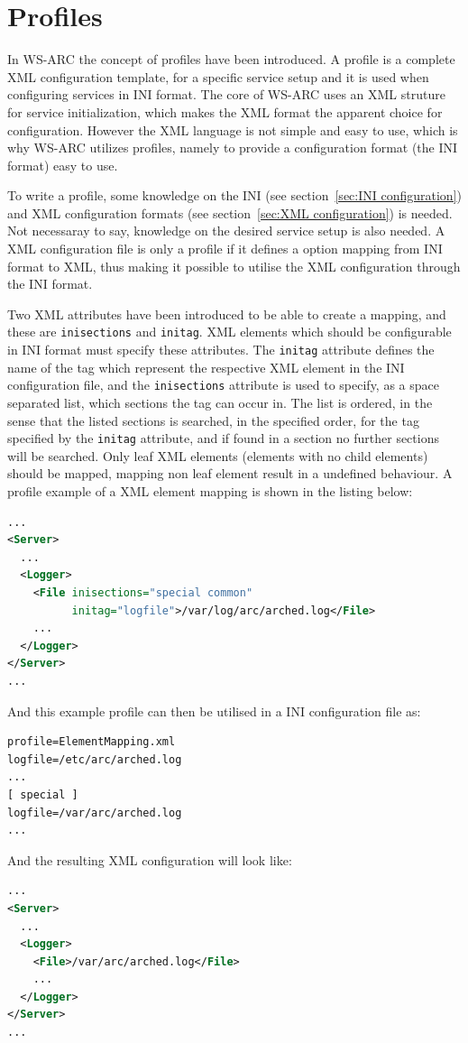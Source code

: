\documentclass{article}
\begin{document}
\section{Profiles}\label{sec:Profiles}
In WS-ARC the concept of profiles have been introduced. A profile is a complete
XML configuration template, for a specific service setup and it is used when
configuring services in INI format. The core of WS-ARC
uses an XML struture for service initialization, which makes the XML format
the apparent choice for configuration. However the XML language is not simple
and easy to use, which is why WS-ARC utilizes profiles, namely to provide a
configuration format (the INI format) easy to use.

To write a profile, some knowledge on the INI (see
section~\ref{sec:INI configuration}) and XML configuration formats (see
section~\ref{sec:XML configuration}) is needed. Not necessaray to say, knowledge
on the desired service setup is also needed. A XML configuration file is only a
profile if it defines a option mapping from INI format to XML, thus making it
possible to utilise the XML configuration through the INI format.

Two XML attributes have been introduced to be able to create a mapping, and
these are \texttt{inisections} and \texttt{initag}. XML elements which should be
configurable in INI format must specify these attributes. The \texttt{initag}
attribute defines the name of the tag which represent the respective XML element
in the INI configuration file, and the \texttt{inisections} attribute is used to
specify, as a space separated list, which sections the tag can occur in. The
list is ordered, in the sense that the listed sections is searched, in the
specified order, for the tag specified by the \texttt{initag} attribute, and if
found in a section no further sections will be searched. Only leaf XML elements
(elements with no child elements) should be mapped, mapping non leaf element
result in a undefined behaviour. A profile example of a XML element mapping is
shown in the listing below:
\begin{lstlisting}[language=xml,title=ElementMapping.xml]
...
<Server>
  ...
  <Logger>
    <File inisections="special common"
          initag="logfile">/var/log/arc/arched.log</File>
    ...
  </Logger>
</Server>
...
\end{lstlisting}
And this example profile can then be utilised in a INI configuration file as:
\begin{lstlisting}[language=xml,title=ElementMapping.ini]
profile=ElementMapping.xml
logfile=/etc/arc/arched.log
...
[ special ]
logfile=/var/arc/arched.log
...
\end{lstlisting}
And the resulting XML configuration will look like:
\begin{lstlisting}[language=xml]
...
<Server>
  ...
  <Logger>
    <File>/var/arc/arched.log</File>
    ...
  </Logger>
</Server>
...
\end{lstlisting}
\end{document}
